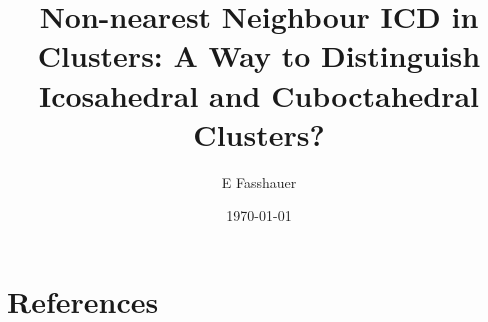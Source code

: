 \documentclass[12pt,twocolumn]{iopart}
\begin{document}
\setlength{\tabcolsep}{12pt}


\title[Non-nearest Neighbour ICD in Clusters]{Non-nearest Neighbour ICD in Clusters: A Way to Distinguish Icosahedral
       and Cuboctahedral Clusters?}

\author{E Fasshauer}
\address{Centre for Theoretical and Computational Chemistry,
         Department of Chemistry, University of Troms\o,
         -- The Arctic University of Norway, N-9037 Troms\o, Norway}



\date{\today}

\begin{abstract}
 
\end{abstract}


\maketitle












\eject
\section*{References}




\end{document}
